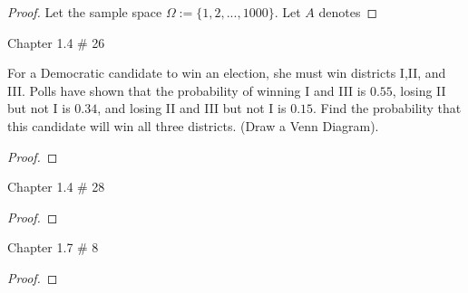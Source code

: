 \documentclass{article}
\begin{document}
\begin{proof}
    Let the sample space $\Omega:=\{1,2,...,1000\}$. Let $A$ denotes
\end{proof}

\newpage

\begin{ques}\label{q8}
    Chapter 1.4 \# 26

    For a Democratic candidate to win an election, she must win districts I,II, and III. Polls have shown that the probability of winning I and III is $0.55$, losing II but not I is $0.34$, and losing II and III but not I is $0.15$. Find the probability that this candidate will win all three districts. (Draw a Venn Diagram).
\end{ques}

\begin{proof}
\end{proof}

\newpage

\begin{ques}\label{q9}
    Chapter 1.4 \# 28
\end{ques}

\begin{proof}
\end{proof}

\newpage

\begin{ques}\label{q10}
    Chapter 1.7 \# 8
\end{ques}

\begin{proof}
\end{proof}

\newpage
\end{document}

